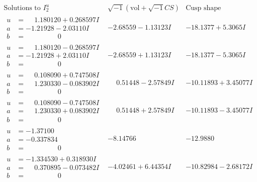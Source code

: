 \documentclass[1p]{elsarticle_modified}
\theoremstyle{definition}
\newcommand{\I}{\sqrt{-1}}
\begin{document}
$$\begin{array}{c|c|c}  
\text{Solutions to }I^u_{2}& \I (\text{vol} + \sqrt{-1}CS) & \text{Cusp shape}\\
 \hline 
\begin{aligned}
u &= \phantom{-}1.180120 + 0.268597 I \\
a &= -1.21928 - 2.03110 I \\
b &= \phantom{-0.000000 } 0\end{aligned}
 & -2.68559 - 1.13123 I & -18.1377 + 5.3065 I \\ \hline\begin{aligned}
u &= \phantom{-}1.180120 - 0.268597 I \\
a &= -1.21928 + 2.03110 I \\
b &= \phantom{-0.000000 } 0\end{aligned}
 & -2.68559 + 1.13123 I & -18.1377 - 5.3065 I \\ \hline\begin{aligned}
u &= \phantom{-}0.108090 + 0.747508 I \\
a &= \phantom{-}1.230330 - 0.083902 I \\
b &= \phantom{-0.000000 } 0\end{aligned}
 & \phantom{-}0.51448 - 2.57849 I & -10.11893 + 3.45077 I \\ \hline\begin{aligned}
u &= \phantom{-}0.108090 - 0.747508 I \\
a &= \phantom{-}1.230330 + 0.083902 I \\
b &= \phantom{-0.000000 } 0\end{aligned}
 & \phantom{-}0.51448 + 2.57849 I & -10.11893 - 3.45077 I \\ \hline\begin{aligned}
u &= -1.37100\phantom{ +0.000000I} \\
a &= -0.337834\phantom{ +0.000000I} \\
b &= \phantom{-0.000000 } 0\end{aligned}
 & -8.14766\phantom{ +0.000000I} & -12.9880\phantom{ +0.000000I} \\ \hline\begin{aligned}
u &= -1.334530 + 0.318930 I \\
a &= \phantom{-}0.370895 - 0.073482 I \\
b &= \phantom{-0.000000 } 0\end{aligned}
 & -4.02461 + 6.44354 I & -10.82984 - 2.68172 I \\ \hline\begin{aligned}

\end{aligned}
\end{array}$$
\end{document}
